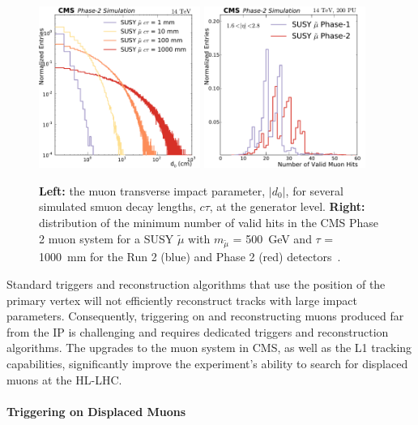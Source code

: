 \begin{figure}[t]\begin{center}
\includegraphics[width=0.47\textwidth]{figures/Stage0h1_0_d0_smuon_daughter}
\includegraphics[width=0.47\textwidth]{figures/MuonHitsEndcap}
\caption{
{\bf Left:} the muon transverse impact parameter, $|d_{0}|$, for several simulated smuon decay lengths, $c\tau$, at the generator level.
{\bf Right:} distribution of the minimum number of valid hits in the CMS Phase 2 muon system for a SUSY $\widetilde{\mu}$ with $m_{\widetilde{\mu}}$ = 500~GeV and $\tau$ = 1000~mm for the Run 2 (blue) and Phase 2 (red) detectors~\cite{Lourenco:2283189}.
}
\label{fig:perfDisplaced}
\end{center}
\end{figure}

Standard triggers and reconstruction algorithms that use the position of the primary vertex will not efficiently reconstruct tracks with large impact parameters. Consequently, triggering on and reconstructing muons produced far  from the IP is challenging and requires dedicated triggers and reconstruction algorithms. The upgrades to the muon system in CMS, as well as the L1 tracking capabilities, significantly improve the experiment's ability to search for displaced muons at the HL-LHC.

\paragraph{Triggering on Displaced Muons}

